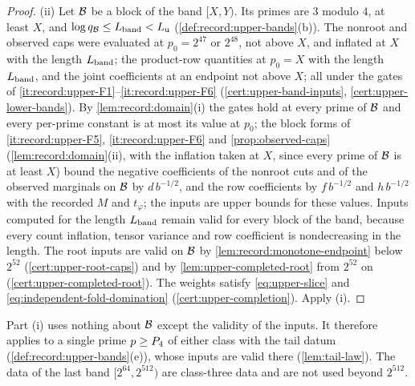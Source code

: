 \begin{proof}
(ii) Let $\mathcal B$ be a block of the band $[X,Y)$. Its primes are $3$ modulo $4$, at least
$X$, and $\log q_\mathcal B\le L_{\rm band}<L_{\rm u}$ (\cref{def:record:upper-bands}(b)). The
nonroot and observed caps were evaluated at $p_0=2^{47}$ or $2^{48}$, not above $X$, and
inflated at $X$ with the length $L_{\rm band}$; the product-row quantities at $p_0=X$
with the length $L_{\rm band}$, and the joint coefficients at an endpoint not above $X$;
all under the gates of \ref{it:record:upper-F1}--\ref{it:record:upper-F6}
(\cref{cert:upper-band-inputs}, \cref{cert:upper-lower-bands}). By
\cref{lem:record:domain}(i) the gates hold at every prime of $\mathcal B$ and every per-prime
constant is at most its value at $p_0$; the block forms of \ref{it:record:upper-F5},
\ref{it:record:upper-F6} and \cref{prop:observed-caps} (\cref{lem:record:domain}(ii),
with the inflation taken at $X$, since every prime of $\mathcal B$ is at least $X$) bound the
negative coefficients of the nonroot cuts and of the observed marginals on $\mathcal B$ by
$d\,b^{-1/2}$, and the row coefficients by $f\,b^{-1/2}$ and $h\,b^{-1/2}$ with the
recorded $M$ and $t_\varphi$; the inputs are upper bounds for these values. Inputs
computed for the length $L_{\rm band}$ remain valid for every block of the band,
because every count inflation, tensor variance and row coefficient is nondecreasing in
the length. The root inputs are valid on $\mathcal B$ by
\cref{lem:record:monotone-endpoint} below $2^{52}$ (\cref{cert:upper-root-caps}) and by
\cref{lem:upper-completed-root} from $2^{52}$ on (\cref{cert:upper-completed-root}). The
weights satisfy \eqref{eq:upper-slice} and \eqref{eq:independent-fold-domination}
(\cref{cert:upper-completion}). Apply (i).
\end{proof}

Part (i) uses nothing about $\mathcal B$ except the validity of the inputs. It therefore
applies to a single prime $p\ge P_4$ of either class with the tail datum
(\cref{def:record:upper-bands}(e)), whose inputs are valid there (\cref{lem:tail-law}).
The data of the last band $[2^{64},2^{512})$ are class-three data and are not used
beyond $2^{512}$.

